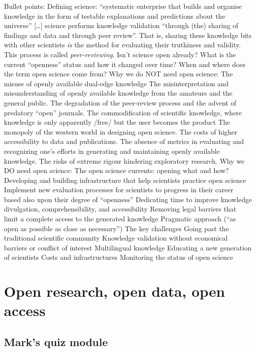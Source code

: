 \documentclass[
]{book}
\begin{document}
Bullet points:
Defining science: ``systematic enterprise that builds and organise knowledge in the form of testable explanations and predictions about the universe'' {[}\ldots{]} science performs knowledge validation ``through (the) sharing of findings and data and through peer review''. That is, sharing these knowledge bits with other scientists \emph{is} the method for evaluating their truthiness and validity. This process is called \emph{peer-reviewing}.
Isn't science open already? What is the current ``openness'' status and how it changed over time? When and where does the term open science come from?
Why we do NOT need open science:
The misuse of openly available dual-edge knowledge
The misinterpretation and misunderstanding of openly available knowledge from the amateurs and the general public.
The degradation of the peer-review process and the advent of predatory ``open'' journals.
The commodification of scientific knowledge, where knowledge is only apparently /free/ but the user becomes the product
The monopoly of the western world in designing open science.
The costs of higher accessibility to data and publications.
The absence of metrics in evaluating and recognizing one's efforts in generating and maintaining openly available knowledge.
The risks of extreme rigour hindering exploratory research.
Why we DO need open science:
The open science currents: opening what and how?
Developing and building infrastructure that help scientists practice open science
Implement new evaluation processes for scientists to progress in their career based also upon their degree of ``openness''
Dedicating time to improve knowledge divulgation, comprehensibility, and accessibility
Removing legal barriers that limit a complete access to the generated knowledge
Pragmatic approach (``as open as possible as close as necessary'')
The key challenges
Going past the traditional scientific community
Knowledge validation without economical barriers or conflict of interest
Multilingual knowledge
Educating a new generation of scientists
Costs and infrastructures
Monitoring the status of open science

\hypertarget{open-research-open-data-open-access}{%
\chapter{Open research, open data, open access}\label{open-research-open-data-open-access}}

\hypertarget{marks-quiz-module}{%
\section{Mark's quiz module}\label{marks-quiz-module}}
\end{document}
